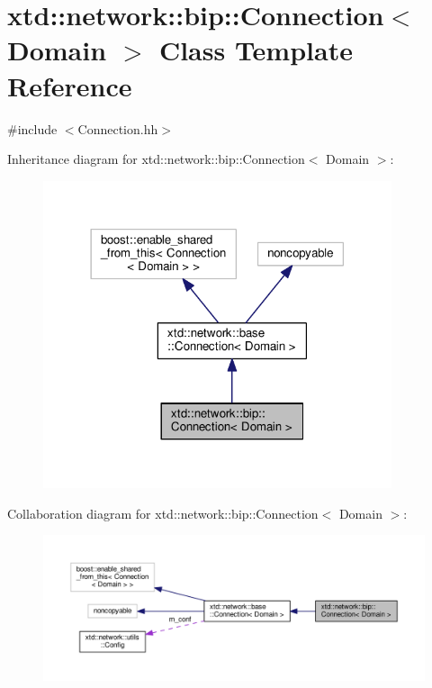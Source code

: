\hypertarget{classxtd_1_1network_1_1bip_1_1Connection}{}\section{xtd\+:\+:network\+:\+:bip\+:\+:Connection$<$ Domain $>$ Class Template Reference}
\label{classxtd_1_1network_1_1bip_1_1Connection}


{\ttfamily \#include $<$Connection.\+hh$>$}



Inheritance diagram for xtd\+:\+:network\+:\+:bip\+:\+:Connection$<$ Domain $>$\+:
\nopagebreak
\begin{figure}[H]
\begin{center}
\leavevmode
\includegraphics[width=290pt]{classxtd_1_1network_1_1bip_1_1Connection__inherit__graph}
\end{center}
\end{figure}


Collaboration diagram for xtd\+:\+:network\+:\+:bip\+:\+:Connection$<$ Domain $>$\+:
\nopagebreak
\begin{figure}[H]
\begin{center}
\leavevmode
\includegraphics[width=350pt]{classxtd_1_1network_1_1bip_1_1Connection__coll__graph}
\end{center}
\end{figure}
